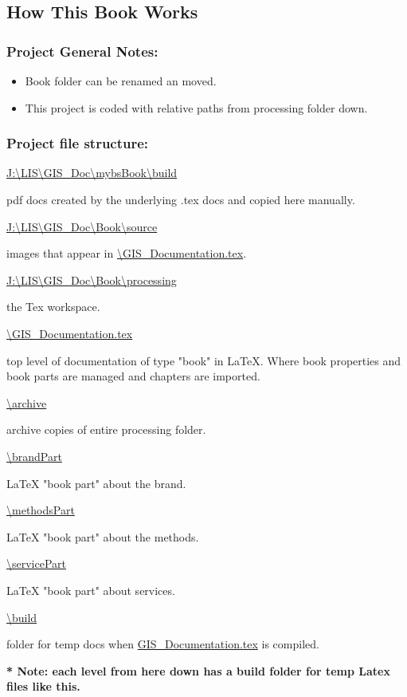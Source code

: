 \documentclass[class=book , crop=false]{standalone}
\begin{document}
\subsection{How This Book Works}

	\subsubsection{Project General Notes:}
		\begin{itemize}
		\item Book folder can be renamed an moved.
		\item This project is coded with relative paths from processing folder down.
		\end{itemize}

	\subsubsection{Project file structure:}			
		\url{J:\LIS\GIS_Doc\mybsBook\build} 
			\begin{description}
			\item pdf docs created by the underlying .tex docs and copied here manually.
			\end{description}		
		\url{J:\LIS\GIS_Doc\Book\source}
			\begin{description}
			\item images that appear in \url{\GIS_Documentation.tex}.
			\end{description}
		\url{J:\LIS\GIS_Doc\Book\processing}
			\begin{description}
			\item the Tex workspace.
			\end{description}
		\url{\GIS_Documentation.tex}
			\begin{description}
			\item top level of documentation of type "book" in \LaTeX{}.  Where book properties and book parts are managed and chapters are imported.
			\end{description}
		\url{\archive}
			\begin{description}
			\item archive copies of entire processing folder.
			\end{description}
		\url{\brandPart}
			\begin{description}
			\item \LaTeX{} "book part" about the brand.
			\end{description}
		\url{\methodsPart}
			\begin{description}
			\item \LaTeX{} "book part" about the methods.
			\end{description}
		\url{\servicePart}
			\begin{description}
			\item \LaTeX{} "book part" about services.
			\end{description}
		\url{\build}
			\begin{description}
			\item folder for temp docs when \url{GIS_Documentation.tex} is compiled.
			\end{description}
	\textbf{* Note: each level from here down has a build folder for temp Latex files like this.}
	\newpage 
\end{document}
